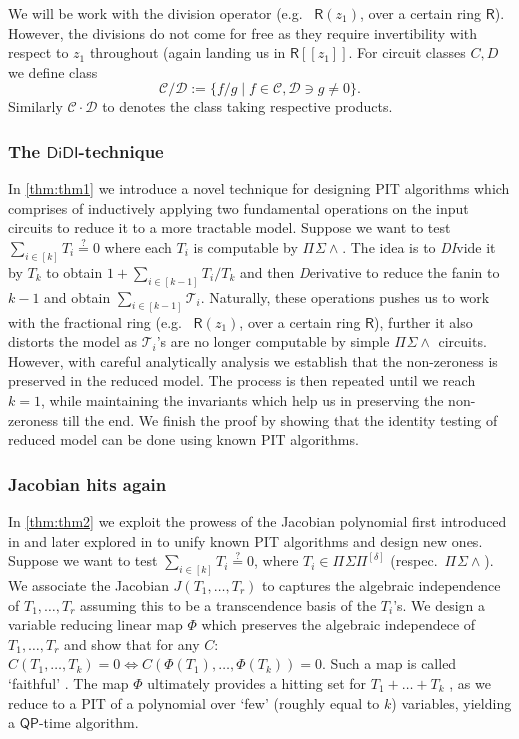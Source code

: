 \documentclass[10pt,a4paper]{article}
\newcommand{\QP}{\mathsf{QP}}
\newcommand{\DiDI}{\mathsf{DiDI}}
\newcommand{\ringR}{\mathsf{R}}
\newcommand{\calC}{\mathcal{C}}
\newcommand{\calD}{\mathcal{D}}
\newcommand{\calT}{\mathcal{T}}
\newcommand{\PSP}[2]{\Pi^{#1}\Sigma\Pi^{#2}}
\newcommand{\PSU}[2]{\Pi^{#1} \Sigma\wedge^{#2}}
\numberwithin{equation}{section}
\begin{document}
We will be work with the division operator (e.g.~ $\ringR(z_1)$, over a certain ring $\ringR$). However, the divisions do not come for free as they require invertibility with respect to $z_1$ throughout (again landing us in $\ringR[[z_1]]$. For circuit classes $C, D$ we define class \[\calC/\calD:=\{f/g \mid f\in \calC, \calD \ni g \neq 0\}.\]Similarly $\calC \cdot \calD$ to denotes the class taking respective products.

\subsubsection{The \texorpdfstring{$\DiDI$}{DiDI}-technique} In \autoref{thm:thm1} we introduce a novel technique for designing PIT algorithms which comprises of inductively applying two fundamental operations on the input circuits to reduce it to a more tractable model. Suppose we want to test $\sum_{i \in [k]} T_i \stackrel{?}{=} 0$ where each $T_i$ is computable by $\PSU{}{}$. The idea is to \emph{DI}vide it by $T_k$ to obtain $1 + \sum_{i \in [k-1]} T_i/T_k$ and then {\em D}erivative to reduce the fanin to $k-1$ and obtain $\sum_{i \in [k-1]} \calT_i$. Naturally, these operations pushes us to work with the fractional ring (e.g.~ $\ringR(z_1)$, over a certain ring $\ringR$), further it also distorts the model as $\calT_i$'s are no longer computable by simple $\PSU{}{}$ circuits. However, with careful analytically analysis we establish that the non-zeroness is preserved in the reduced model. The process is then repeated until we reach $k=1$, while maintaining the invariants which help us in preserving the non-zeroness till the end. We finish the proof by showing that the identity testing of reduced model can be done using known PIT algorithms.


\subsubsection{Jacobian hits again} In \autoref{thm:thm2} we exploit the prowess of the Jacobian polynomial first introduced in \cite{beecken2013algebraic} and later explored in \cite{agrawal2016jacobian} to unify known PIT algorithms and design new ones. Suppose we want to test $\sum_{i \in [k]} T_i \stackrel{?}{=} 0$, where $T_i \in \PSP{}{[\delta]}$ (respec.~$\PSU{}{}$). We associate the Jacobian $J(T_1, \hdots, T_r)$ to captures the algebraic independence of $T_1, \hdots, T_r$ assuming this to be a transcendence basis of the $T_i$’s. We design a variable reducing linear map $\Phi$ which preserves the algebraic independece of $T_1, \dots, T_r$ and show that for any $C$: $C(T_1,\hdots, T_k) = 0 \iff C(\Phi(T_1), \hdots, \Phi(T_k)) = 0$. Such a map is called `faithful' \cite{agrawal2016jacobian}. The map $\Phi$ ultimately provides a hitting set for $T_1 + \hdots +T_k$ , as we reduce to a PIT of a polynomial over `few' (roughly equal to $k$) variables, yielding a $\QP$-time algorithm.
\end{document}
